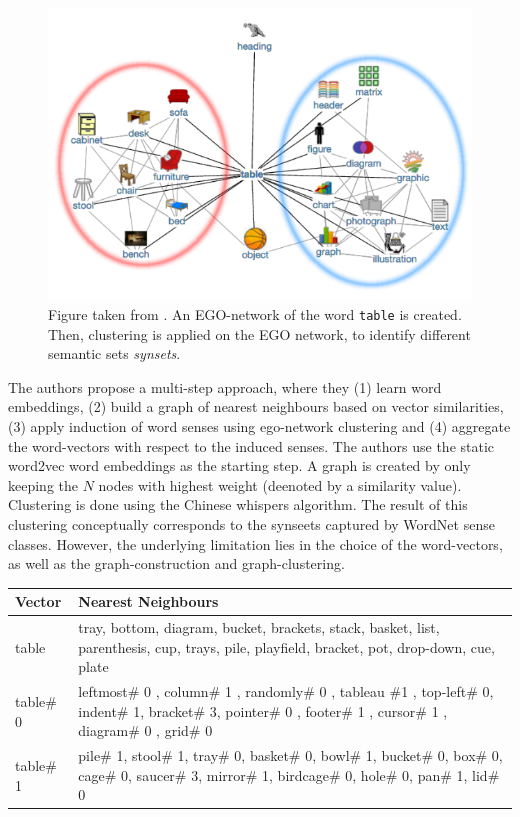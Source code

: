 \documentclass[a4paper,12pt,twoside,openright]{report}
\begin{document}
\begin{figure}[h]
	\center
  \includegraphics[width=0.6\linewidth]{./assets/relatedwork/ego_network.png}
  \caption{Figure taken from \cite{pelevina16}. An EGO-network of the word \texttt{table} is created. Then, clustering is applied on the EGO network, to identify different semantic sets \textit{synsets}.}
  \label{fig:ego_network}
\end{figure}

The authors propose a multi-step approach, where they (1) learn word embeddings, (2) build a graph of nearest neighbours based on vector similarities, (3) apply induction of word senses using ego-network clustering and (4) aggregate the word-vectors with respect to the induced senses.
The authors use the static word2vec word embeddings as the starting step.
A graph is created by only keeping the $N$ nodes with highest weight (deenoted by a similarity value).
Clustering is done using the Chinese whispers algorithm.
The result of this clustering conceptually corresponds to the synseets captured by WordNet sense classes.
However, the underlying limitation lies in the choice of the word-vectors, as well as the graph-construction and graph-clustering.

\begin{table}[htbp]
    \centering
    \begin{tabularx}{\textwidth}{p{50pt}|b}
    \toprule
      {\textbf{Vector}} & {\textbf{Nearest Neighbours}}  \\ \midrule
        table & tray, bottom, diagram, bucket, brackets, stack, basket, list, parenthesis, cup, trays, pile, playfield, bracket, pot, drop-down, cue, plate \\ \hline
        table\# 0 & leftmost\# 0 , column\# 1 , randomly\# 0 , tableau \#1 , top-left\# 0, indent\# 1, bracket\# 3, pointer\# 0 , footer\# 1 , cursor\# 1 , diagram\# 0 , grid\# 0      \\ \hline
        table\# 1 & pile\# 1, stool\# 1, tray\# 0, basket\# 0, bowl\# 1, bucket\# 0, box\# 0, cage\# 0, saucer\# 3, mirror\# 1, birdcage\# 0, hole\# 0, pan\# 1, lid\# 0    \\ \hline
    \end{tabularx}
\end{table}
\end{document}
